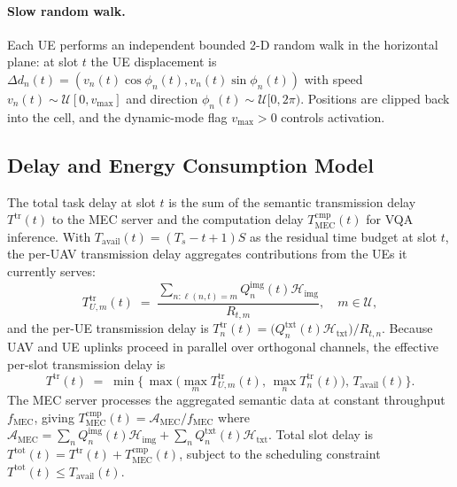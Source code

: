 \paragraph{Slow random walk.} Each UE performs an independent bounded
2-D random walk in the horizontal plane: at slot $t$ the UE displacement
is $\Delta d_{n}(t)=(v_{n}(t)\cos\phi_{n}(t),v_{n}(t)\sin\phi_{n}(t))$
with speed $v_{n}(t)\sim\mathcal{U}[0,v_{\max}]$ and direction
$\phi_{n}(t)\sim\mathcal{U}[0,2\pi)$. Positions are clipped back into
the cell, and the dynamic-mode flag $v_{\max}>0$ controls activation.

\subsection{Delay and Energy Consumption Model}\label{subsec:cost}
The total task delay at slot $t$ is the sum of the semantic
transmission delay $T^{\mathrm{tr}}(t)$ to the MEC server and the
computation delay $T^{\mathrm{cmp}}_{\mathrm{MEC}}(t)$ for VQA
inference. With $T_{\mathrm{avail}}(t)=(T_s-t+1)S$ as the residual time
budget at slot $t$, the per-UAV transmission delay aggregates contributions
from the UEs it currently serves:
\begin{equation}
T^{\mathrm{tr}}_{\!U,m}(t)
\;=\; \frac{\sum_{n:\ell(n,t)=m} Q^{\mathrm{img}}_{n}(t)\mathcal{H}_{\mathrm{img}}}
            {R_{t,m}},
\quad m\in\mathcal{U},
\label{eq:tu}
\end{equation}
and the per-UE transmission delay is
$T^{\mathrm{tr}}_{\!n}(t)=
\big(Q^{\mathrm{txt}}_{n}(t)\mathcal{H}_{\mathrm{txt}}\big)/R_{t,n}$.
Because UAV and UE uplinks proceed in parallel over orthogonal
channels, the effective per-slot transmission delay is
\begin{equation}
T^{\mathrm{tr}}(t) \;=\;
\min\!\Big\{\,
   \max\!\big(\max_{m}T^{\mathrm{tr}}_{\!U,m}(t),\,
              \max_{n}T^{\mathrm{tr}}_{\!n}(t)\big),\,
   T_{\mathrm{avail}}(t)\Big\}.
\label{eq:ttotal}
\end{equation}
The MEC server processes the aggregated semantic data at constant
throughput $f_{\mathrm{MEC}}$, giving
$T^{\mathrm{cmp}}_{\mathrm{MEC}}(t)=\mathcal{A}_{\mathrm{MEC}}/
f_{\mathrm{MEC}}$ where $\mathcal{A}_{\mathrm{MEC}}=
\sum_{n}\!Q^{\mathrm{img}}_{n}(t)\mathcal{H}_{\mathrm{img}}+
\sum_{n}\!Q^{\mathrm{txt}}_{n}(t)\mathcal{H}_{\mathrm{txt}}$. Total
slot delay is $T^{\mathrm{tot}}(t)=T^{\mathrm{tr}}(t)+
T^{\mathrm{cmp}}_{\mathrm{MEC}}(t)$, subject to the scheduling
constraint $T^{\mathrm{tot}}(t)\le T_{\mathrm{avail}}(t)$.

